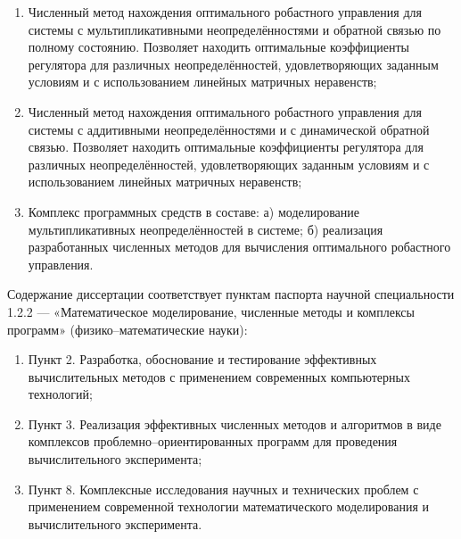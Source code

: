 {}

\begin{enumerate}[beginpenalty=10000] %
	\item Численный метод нахождения оптимального робастного управления для системы с мультипликативными неопределённостями и обратной связью по полному состоянию. Позволяет находить оптимальные коэффициенты регулятора для различных неопределённостей, удовлетворяющих заданным условиям и с использованием линейных матричных неравенств; 
	\item Численный метод нахождения оптимального робастного управления для системы с аддитивными неопределённостями и с динамической обратной связью. Позволяет находить оптимальные коэффициенты регулятора для различных неопределённостей, удовлетворяющих заданным условиям и с использованием линейных матричных неравенств; 
	\item Комплекс программных средств в составе: а) моделирование мультипликативных неопределённостей в системе; б) реализация разработанных численных методов для вычисления оптимального робастного управления. 
\end{enumerate}

{\compliances} 

Содержание диссертации соответствует пунктам паспорта научной специальности 1.2.2 --- «Математическое моделирование, численные методы и комплексы программ» (физико--математические науки):
\begin{enumerate}[beginpenalty=10000]
	\item Пункт 2. Разработка, обоснование и тестирование эффективных вычислительных методов с применением современных компьютерных технологий;
	\item Пункт 3. Реализация эффективных численных методов и алгоритмов в виде комплексов проблемно--ориентированных программ для проведения вычислительного эксперимента;
	\item Пункт 8. Комплексные исследования научных и технических проблем с применением современной технологии математического моделирования и вычислительного эксперимента.
\end{enumerate}

{\novelty}


